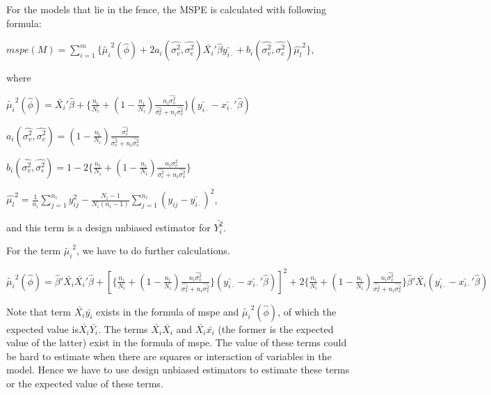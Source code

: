 \documentclass[11pt,letter]{article}
\begin{document}
For the models that lie in the fence, the MSPE is calculated with following formula:

\hspace{2cm}$mspe(M) = \sum\limits_{i = 1}^m\{  \tilde{\mu_i}^2(\hat{\phi}) + 2a_i(\hat{\sigma_{v}^{2}},\hat{\sigma_{e}^{2}} )\bar{X_i}' \hat{\beta}\bar{y_{i\cdot}} + b_i(\hat{\sigma_{v}^{2}},\hat{\sigma_{e}^{2}})\hat{\mu_l}^2   \}, $

where

\hspace{2cm}$\tilde{\mu_i}^2(\hat{\phi}) =\bar{X_i}' \hat{\beta} + \{ \frac{n_i}{N_i} + (1- \frac{n_i}{N_i}) \frac{n_i\hat{\sigma_{v}^{2}} }{\hat{\sigma_{e}^{2}}+ n_i\hat{\sigma_{v}^{2}} }  \}(\bar{y_{i\cdot}} - \bar{x_{i\cdot}}' \hat{\beta} ) $

\hspace{2cm}$a_i(\hat{\sigma_{v}^{2}},\hat{\sigma_{e}^{2}} ) =  (1- \frac{n_i}{N_i})\frac{\hat{\sigma_{e}^{2}} }{\hat{\sigma_{e}^{2}}+ n_i\hat{\sigma_{v}^{2}} }  $ 

\hspace{2cm}$  b_i(\hat{\sigma_{v}^{2}},\hat{\sigma_{e}^{2}}) = 1 - 2\{ \frac{n_i}{N_i} + (1- \frac{n_i}{N_i}) \frac{n_i\hat{\sigma_{v}^{2}} }{\hat{\sigma_{e}^{2}}+ n_i\hat{\sigma_{v}^{2}} }  \} $

\hspace{2cm}$ \hat{\mu_l}^2 =  \frac{1}{n_i}\sum_{j=1}^{n_i}y_{ij}^2 - \frac{N_i - 1}{N_i(n_i - 1)}\sum_{j=1}^{n_i}(y_{ij} - \bar{y_{i\cdot}} )^2  $,

and this term is a design unbiased estimator for $\bar{Y_i^2}$.

For the term $\tilde{\mu_i}^2$, we have to do further calculations.

\hspace{0.1cm}$\tilde{\mu_i}^2(\hat{\phi}) = \hat{\beta}'\bar{X_i}\bar{X_i}' \hat{\beta} + [\{ \frac{n_i}{N_i} + (1- \frac{n_i}{N_i}) \frac{n_i\hat{\sigma_{v}^{2}} }{\hat{\sigma_{e}^{2}}+ n_i\hat{\sigma_{v}^{2}} }  \}(\bar{y_{i\cdot}} - \bar{x_{i\cdot}}' \hat{\beta} ) ]^2 + 2\{ \frac{n_i}{N_i} + (1- \frac{n_i}{N_i}) \frac{n_i\hat{\sigma_{v}^{2}} }{\hat{\sigma_{e}^{2}}+ n_i\hat{\sigma_{v}^{2}} }  \}\hat{\beta}'\bar{X_i} (\bar{y_{i\cdot}} - \bar{x_{i\cdot}}' \hat{\beta} )  $

Note that term $\bar{X_i}\bar{y_i}$ exists in the formula of mspe and $\tilde{\mu_i}^2(\hat{\phi})$, of which the expected value is$\bar{X_i}\bar{Y_i}$. The terms  $\bar{X_i}\bar{X_i}$ and $\bar{X_i}\bar{x_i}$ (the former is the expected value of the latter) exist in the formula of mspe. The value of these terms could be hard to estimate when there are squares or interaction of variables in the model. Hence we have to use design unbiased estimators to estimate these terms or the expected value of these terms.
\end{document}
